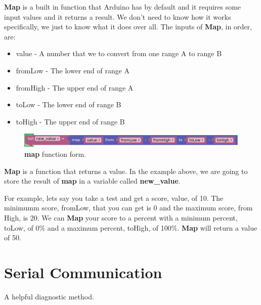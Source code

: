 \documentclass[12pt]{article}
\begin{document}
	\textbf{Map} is a built in function that Arduino has by default and it requires some input values and it returns a result. We don't need to know how it works specifically, we just to know what it does over all. The inputs of \textbf{Map}, in order, are:
	
	
	
	\begin{itemize}
		\itemsep -1em
		\item value - A number that we to convert from one range A to range B
		\item fromLow - The lower end of range A
		\item fromHigh - The upper end of range A
		\item toLow - The lower end of range B
		\item toHigh - The upper end of range B
	\end{itemize}

	\begin{figure}[H]
	\begin{center}
		\includegraphics[scale=0.5]{MAP_parameters}
		\caption{\textbf{map} function form.}
		\label{fn:MAP_parameters}
	\end{center}
	\end{figure}

	\textbf{Map} is a function that returns a value. In the example above, we are going to store the result of \textbf{map} in a variable called \textbf{new\_value}.
	
	For example, lets say you take a test and get a score, value, of 10. The minimumm score, fromLow, that you can get is 0 and the maximum score, from High, is 20. We can \textbf{Map} your score to a percent with a minimum percent, toLow, of 0\% and a maximum percent, toHigh, of 100\%. \textbf{Map} will return a value of 50.
	
	
	
	\section{Serial Communication}
	
	A helpful diagnostic method.
	
	
	
	
	
	
\end{document}
